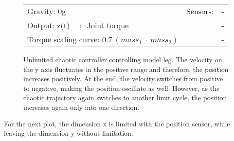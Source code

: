 \documentclass[main]{subfiles}
\begin{document}
\begin{figure}[H]
	\centering
	\begin{minipage}{1.3\textwidth}
	\hspace*{-5em}
	\end{minipage}
	\caption[Unlimited chaotic controller controlling model leg.]{Unlimited chaotic controller controlling model leg. The velocity on the y axis fluctuates in the positive range and therefore, the position increases positively. At the end, the velocity switches from positive to negative, making the position oscillate as well. However, as the chaotic trajectory again switches to another limit cycle, the position increases again only into one direction.}
	\begin{tabular}{l|ll}
	\hline 
	Gravity: 0g  & Sensors: & - \\
	 Output: z(t) \(\rightarrow\) Joint torque & & - \\
	  Torque scaling curve: \(0.7~(mass_1~\cdot~mass_2)\) & & - \\
	  \hline
	\end{tabular}

	\label{figure:unlimited-model-leg}
\end{figure}

For the next plot, the dimension x is limited with the position sensor, while leaving the dimension y without limitation.
\end{document}
